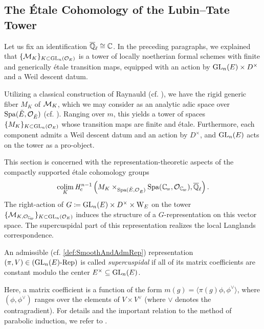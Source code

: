 \documentclass[../main.tex]{subfiles}
\begin{document}


\subsection{The \'Etale Cohomology of the Lubin--Tate Tower} %
\label{sub:The Local Langlands Correspondence for the General Linear Group}
Let us fix an identification ${\overline {\mathbb{Q}}_\ell} \cong \mathbb{C}$.
In the preceding paragraphs, we explained that $\{\mathcal{M}_{K}\}_{K \subset
\operatorname{GL}_n(\mathcal{O}_E)}$ is a 
tower of locally noetherian formal schemes with finite and generically \'etale 
transition maps, equipped with an action by $\operatorname{GL}_n(E) \times D^\times$ and 
a Weil descent datum. 

Utilizing a classical construction of Raynauld (cf. \cite{raynaud1974geometrie}),
we have the rigid generic fiber $M_{K}$ of $\mathcal{M}_{K}$, 
which we may consider as an analytic adic space over $\operatorname{Spa}({\breve {E}},\mathcal{O}_{\breve {E}})$ 
(cf. \cite[Section 1.9]{huber2013etale}). 
Ranging over $m$, this yields a tower of spaces $\{M_{K}\}_{K \subset
\operatorname{GL}_n(\mathcal{O}_E)}$ whose transition maps are finite and \'etale. Furthermore, each
component admits a Weil descent datum and an action by $D^\times$, and $\operatorname{GL}_n(E)$
acts on the tower as a pro-object.

This section is concerned with the representation-theoretic aspects of
the compactly supported \'etale cohomology groups
\begin{equation*}
  \colim_K \hHc^{n-1} \left(M_{K} \times_{\spa({\br E,\cO_\br E})} \Spa(\Cp, \cO_\Cp),
  \bar \Q_\ell\right).
\end{equation*}
The right-action of $G \coloneqq \operatorname{GL}_n(E) \times D^\times \times \mathrm W_E$ on the tower
$\{\cM_{K, \cO_\Cp}\}_{K \subset \GL_n(\cO_E)}$ induces the structure of a
$G$-representation on this vector space. 
The supercuspidal part of this representation realizes the local Langlands
correspondence. 

\begin{defi}\label{def:SuperCusp}
  An admissible (cf. \cref{def:SmoothAndAdmRep}) representation $(\pi,V) \in
  {({\operatorname{GL}_n(E)}\textnormal-\allowbreak\mathrm{Rep})}$ is called \emph{supercuspidal} if all of its matrix coefficients are
  constant modulo the center $E^\times \subseteq \operatorname{GL}_n(E)$.
\end{defi}

Here, a matrix coefficient is a function of the form $m(g) = \langle \pi(g)
\phi, \phi^\vee\rangle$, where $(\phi, \phi^\vee)$ ranges over the elements of
$V \times V^\vee$ (where $\vee$ denotes the contragradient). For details and
the important relation to the method of parabolic induction, we refer to
\cite[Section 8]{getz2023introduction}.
\end{document}
